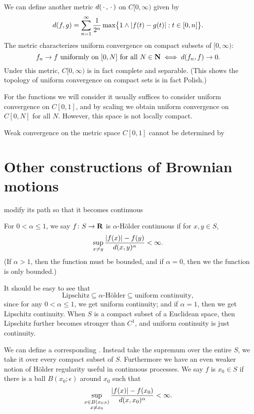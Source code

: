 \documentclass[10pt]{book}
\begin{document}
\begin{prop}
    We can define another metric $d(\,\cdot\,,\,\cdot\,)$ on $C[0,\infty)$ given by  
    \[d(f,g) = \sum_{n = 1}^\infty \frac{1}{2^{n}}\max\bigl\{1 \land \lvert f(t) - g(t) \rvert : t \in [0,n]\bigr\}.\] The metric characterizes uniform convergence on compact subsets of $[0,\infty)$: \[
        f_n \to f \text{ uniformly on }[0,N] \text{ for all }N \in \mathbf{N} \iff d(f_n, f) \to 0.
    \] Under this metric, $C[0,\infty)$ is in fact complete and separable. (This shows the topology of uniform convergence on compact sets is in fact Polish.)
\end{prop}

For the functions we will consider it usually suffices to consider uniform convergence on $C[0,1]$, and by scaling we obtain uniform convergence on $C[0,N]$ for all $N$. However, this space is not locally compact.

Weak convergence on the metric space $C[0,1]$ cannot be determined by 

\section{Other constructions of Brownian motions}

modify its path so that it becomes continuous

For $0 < \alpha \leq 1$, we say $f\colon S \to \mathbf{R}$ is $\alpha$-Hölder continuous if for $x,y \in S$, \[
    \sup_{{x \neq y}} \frac{\lvert f(x) \rvert - f(y)}{d(x,y)^\alpha} < \infty.
\] (If $\alpha > 1$, then the function must be bounded, and if $\alpha = 0$, then we the function is only bounded.)

It should be easy to see that \[
    \text{Lipschitz} \subseteq \alpha\text{-Hölder} \subseteq \text{uniform continuity}, 
\] since for any $0 < \alpha \leq 1$, we get uniform continuity; and if $\alpha = 1$, then we get Lipschitz continuity. When $S$ is a compact subset of a Euclidean space, then Lipschitz further becomes stronger than $C^1$, and uniform continuity is just continuity.

We can define a corresponding . Instead take the supremum over the entire $S$, we take it over every compact subset of $S$. 
Furthermore we have an even weaker notion of Hölder regularity useful in continuous processes. We say $f$ is  $x_0\in S$ if there is a ball $B(x_0;\epsilon)$ around $x_0$ such that \[
    \sup_{\substack{x \in B(x_0;\epsilon) \\ x\neq x_0}} \frac{\lvert f(x) \rvert - f(x_0)}{d(x,x_0)^\alpha} < \infty.
\]
\end{document}
